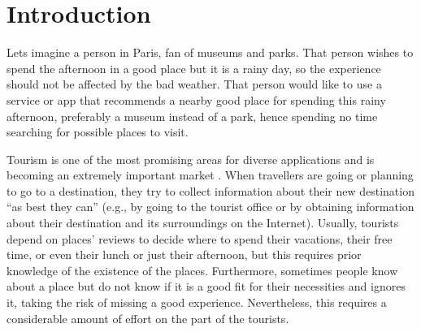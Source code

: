 \section{Introduction}


Lets imagine a person in Paris, fan of museums and parks. That person wishes to spend the afternoon in a good place but it is a rainy day, so the experience should not be affected by the bad weather. That person would like to use a service or app that recommends a nearby good place for spending this rainy afternoon, preferably a museum instead of a park, hence spending no time searching for possible places to visit.

Tourism is one of the most promising areas for diverse applications and is becoming an extremely
important market \cite{buhalis2011tourism,murphy2013tourism,fermoso2015open,ku2015cultivating,alghamdi2016tourism,artemenko2017tourism,kazandzhieva2019tourism}. 
When travellers are going or planning to go to a destination, they try to collect information about their new destination “as best they can” (e.g., by going to the tourist office or by obtaining information about their destination and its surroundings on the Internet). Usually, tourists depend on places' reviews to decide where to spend their vacations, their free time, or even their lunch or just their afternoon, but this requires prior knowledge of the existence of the places. Furthermore, sometimes people know about a place but do not know if it is a good fit for their necessities and ignores it, taking the risk of missing a good experience. Nevertheless, this requires a considerable amount of effort on the part of the tourists.


